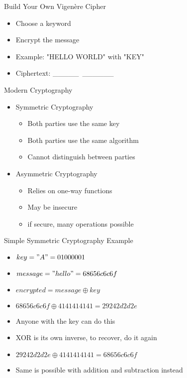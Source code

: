 \begin{withoutheadline}
\begin{frame}{Build Your Own Vigenère Cipher}
\begin{itemize}
    \item Choose a keyword
    \item Encrypt the message
    \item Example: "HELLO WORLD" with "KEY"
    \item Ciphertext: \_\_\_\_\_\ \_\_\_\_\_\_
\end{itemize}
\end{frame}



\begin{frame}{Modern Cryptography}
\begin{itemize}
    \item Symmetric Cryptography
    \begin{itemize}
    \item Both parties use the same key
    \item Both parties use the same algorithm
    \item Cannot distinguish between parties
    \end{itemize}
    \item Asymmetric Cryptography
    \begin{itemize}
    \item Relies on one-way functions
    \item May be insecure
    \item if secure, many operations possible
    \end{itemize}
\end{itemize}
\end{frame}

\begin{frame}{Simple Symmetric Cryptography Example}
\begin{itemize}
    \item $key = "A" = 01000001$
    \item $message = "hello" = 68 65 6c 6c 6f$ 
    \item $encrypted = message \oplus key$
    \item $68 65 6c 6c 6f \oplus 41 41 41 41 41 = 29 24 2d 2d 2e$
    \item Anyone with the key can do this
    \item XOR is its own inverse, to recover, do it again
    \item $29 24 2d 2d 2e \oplus 41 41 41 41 41 = 68 65 6c 6c 6f$
    \item Same is possible with addition and subtraction instead 
\end{itemize}
\end{frame}


\end{withoutheadline}
